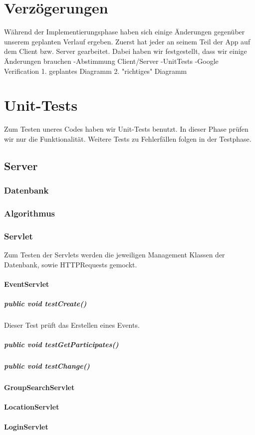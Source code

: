 \documentclass{scrartcl}
\begin{document}
	\newpage
	\section{Verzögerungen}
	Während der Implementierungsphase haben sich einige Änderungen gegenüber unserem geplanten Verlauf ergeben.
	Zuerst hat jeder an seinem Teil der App auf dem Client bzw. Server gearbeitet. Dabei haben wir festgestellt, dass wir einige Änderungen brauchen
	-Abstimmung Client/Server
	-UnitTests
	-Google Verification
	1. geplantes Diagramm
	2. "richtiges" Diagramm
	
	\newpage
	\section{Unit-Tests}
	Zum Testen uneres Codes haben wir Unit-Tests benutzt. In dieser Phase prüfen wir nur die Funktionalität. Weitere Tests zu Fehlerfällen folgen in der Testphase.
	\subsection{Server}
	\subsubsection{Datenbank}
	\subsubsection{Algorithmus}
	\subsubsection{Servlet}
	Zum Testen der Servlets werden die jeweiligen Management Klassen der Datenbank, sowie HTTPRequests gemockt.
	\paragraph{EventServlet}
	\subparagraph{public void testCreate()}
	Dieser Test prüft das Erstellen eines Events. 
	\subparagraph{public void testGetParticipates()}
	\subparagraph{public void testChange()}
	\paragraph{GroupSearchServlet}
	\paragraph{LocationServlet}
	\paragraph{LoginServlet}
\end{document}
